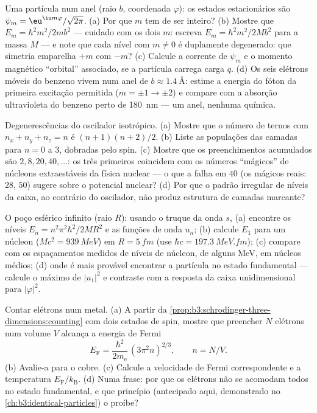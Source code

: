 \begin{exercise}[$\star\star$]\label{exo:b3:schrodinger-three-dimensions:5}
Uma partícula num anel (raio $b$, coordenada $\varphi$): os estados
estacionários são $\psi_m = \eu^{\iu m\varphi}/\sqrt{2\pi}$. (a)
Por que $m$ tem de ser inteiro? (b) Mostre que $E_m = \hbar^2m^2/2mb^2$
--- cuidado com os dois $m$: escreva $E_m = \hbar^2 m^2/2Mb^2$ para a
massa $M$ --- e note que cada nível com $m \neq 0$ é duplamente
degenerado: que simetria emparelha $+m$ com $-m$? (c) Calcule a
corrente de $\psi_m$ e o momento magnético ``orbital'' associado, se a
partícula carrega carga $q$. (d) Os seis elétrons móveis do benzeno
vivem num anel de $b \approx \qty{1.4}{\angstrom}$: estime a energia do
fóton da primeira excitação permitida ($m = \pm1 \to \pm2$) e compare
com a absorção ultravioleta do benzeno perto de \qty{180}{nm} --- um
anel, nenhuma química.
\end{exercise}

\begin{exercise}[$\star\star$]\label{exo:b3:schrodinger-three-dimensions:6}
Degenerescências do oscilador isotrópico. (a) Mostre que o número de
ternos com $n_x + n_y + n_z = n$ é $(n+1)(n+2)/2$. (b) Liste as
populações das camadas para $n = 0$ a $3$, dobradas pelo spin. (c)
Mostre que os preenchimentos acumulados são $2, 8, 20, 40, \dots$: os
três primeiros coincidem com os números ``mágicos'' de núcleons
extraestáveis da física nuclear --- o que a falha em $40$ (os mágicos
reais: $28$, $50$) sugere sobre o potencial nuclear? (d) Por que o
padrão irregular de níveis da caixa, ao contrário do oscilador, não
produz estrutura de camadas marcante?
\end{exercise}

\begin{exercise}[$\star\star$]\label{exo:b3:schrodinger-three-dimensions:7}
O poço esférico infinito (raio $R$): usando o truque da onda $s$,
(a) encontre os níveis $E_n = n^2\pi^2\hbar^2/2MR^2$ e as funções de
onda $u_n$; (b) calcule $E_1$ para um núcleon ($Mc^2 =
\qty{939}{MeV}$) em $R = \qty{5}{fm}$ (use $\hbar c =
\qty{197.3}{MeV.fm}$); (c) compare com os espaçamentos medidos de
níveis de núcleon, de alguns MeV, em núcleos médios; (d) onde é mais
provável encontrar a partícula no estado fundamental --- calcule o
máximo de $|u_1|^2$ e contraste com a resposta da caixa unidimensional
para $|\varphi|^2$.
\end{exercise}

\begin{exercise}[$\star\star$]\label{exo:b3:schrodinger-three-dimensions:8}
Contar elétrons num metal. (a) A partir da
\cref{prop:b3:schrodinger-three-dimensions:counting} com dois estados
de spin, mostre que preencher $N$ elétrons num volume $V$ alcança a
energia de Fermi
\[
E_{\text{F}} = \frac{\hbar^2}{2m_{\text{e}}}\,(3\pi^2n)^{2/3} ,
\qquad n = N/V .
\]
(b) Avalie-a para o cobre. (c) Calcule a velocidade de Fermi
correspondente e a temperatura $E_{\text{F}}/k_{\text{B}}$. (d) Numa
frase: por que os elétrons não se acomodam todos no estado
fundamental, e que princípio (antecipado aqui, demonstrado no
\cref{ch:b3:identical-particles}) o proíbe?
\end{exercise}

